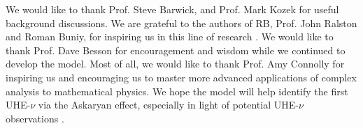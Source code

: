 \documentclass[amsmath,amssymb,aps,prd,10pt,twocolumn,showkeys]{revtex4}
\begin{document}
We would like to thank Prof. Steve Barwick, and Prof. Mark Kozek for useful background discussions.  We are grateful to the authors of RB, Prof. John Ralston and Roman Buniy, for inspiring us in this line of research \cite{10.1103/physrevd.65.016003}.  We would like to thank Prof. Dave Besson for encouragement and wisdom while we continued to develop the model.  Most of all, we would like to thank Prof. Amy Connolly for inspiring us and encouraging us to master more advanced applications of complex analysis to mathematical physics.  We hope the model will help identify the first UHE-$\nu$ via the Askaryan effect, especially in light of potential UHE-$\nu$ observations \cite{collaboration2025observation-22f}.


\end{document}

